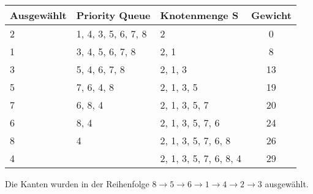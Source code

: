\documentclass[a4paper, 12pt, margins=3cm]{homework}
\begin{document}
  \begin{problem}
    
  \end{problem}
  \begin{solution}\hfill
    \begin{center}
      \def\svgwidth{0.8\textwidth}
    \end{center}
    \begin{center}
      \begin{tabular}{|l|l|l|c|}
        \hline
        Ausgewählt & Priority Queue      & Knotenmenge S          & Gewicht \\ \hline \hline
        2          & 1, 4, 3, 5, 6, 7, 8 & 2                      & 0       \\ \hline
        1          & 3, 4, 5, 6, 7, 8    & 2, 1                   & 8       \\ \hline
        3          & 5, 4, 6, 7, 8       & 2, 1, 3                & 13      \\ \hline
        5          & 7, 6, 4, 8          & 2, 1, 3, 5             & 19      \\ \hline
        7          & 6, 8, 4             & 2, 1, 3, 5, 7          & 20      \\ \hline
        6          & 8, 4                & 2, 1, 3, 5, 7, 6       & 24      \\ \hline
        8          & 4                   & 2, 1, 3, 5, 7, 6, 8    & 26      \\ \hline
        4          &                     & 2, 1, 3, 5, 7, 6, 8, 4 & 29      \\ \hline
      \end{tabular}
    \end{center}

    Die Kanten wurden in der Reihenfolge $8\rightarrow 5\rightarrow 6\rightarrow 1\rightarrow 4\rightarrow 2\rightarrow 3$ ausgewählt.
  \end{solution}
\end{document}
